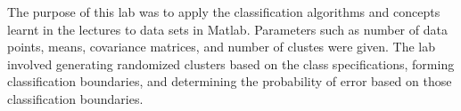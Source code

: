 The purpose of this lab was to apply the classification algorithms and concepts learnt in the lectures to data sets in Matlab.  Parameters such as number of data points, means, covariance matrices,  and number of clustes were given.  The lab involved generating randomized clusters based on the class specifications, forming classification boundaries, and determining the probability of error based on those classification boundaries.  
